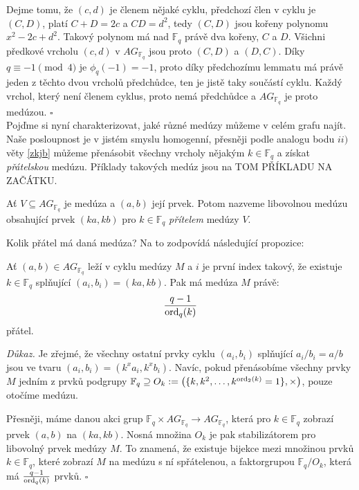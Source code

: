\documentclass[12pt]{report}
\begin{document}
Dejme tomu, že $(c,d)$ je členem nějaké cyklu, předchozí člen v cyklu je $(C,D)$, platí $C+D=2c$ a $CD = d^2$, tedy $(C,D)$ jsou kořeny polynomu $x^2-2c+d^2$. Takový polynom má nad $\mathbb{F}_q$ právě dva kořeny, $C$ a $D$. Všichni předkové vrcholu $(c,d)$ v $AG_{\mathbb{F}_q}$ jsou proto $(C,D)$ a $(D,C)$. Díky $q \equiv -1 \pmod{4}$ je $\phi_q(-1)=-1$, proto díky předchozímu lemmatu má právě jeden z těchto dvou vrcholů předchůdce, ten je jistě taky součástí cyklu. Každý vrchol, který není členem cyklus, proto nemá předchůdce a $AG_{\mathbb{F}_q}$ je proto medúzou. \hfill $\square$\\


Pojďme si nyní charakterizovat, jaké různé medúzy můžeme v celém grafu najít. Naše posloupnost je v jistém smyslu homogenní, přesněji podle analogu bodu $ii)$ věty \ref{zkjb}  můžeme přenásobit všechny vrcholy nějakým $k \in \mathbb{F}_q$ a získat \textit{přátelskou} medúzu. Příklady takových medúz jsou na TOM PŘÍKLADU NA ZAČÁTKU.
\begin{definice}
Ať $V \subseteq AG_{\mathbb{F}_q}$ je medúza a $(a,b)$ její prvek. Potom nazveme libovolnou medúzu obsahující prvek $(ka,kb)$ pro $k \in \mathbb{F}_q$ \textit{přítelem} medúzy $V$.
\end{definice}

 Kolik přátel má daná medúza? Na to zodpovídá následující propozice:
\begin{veta}\label{isom}
Ať $(a,b) \in AG_{\mathbb{F}_q}$ leží v cyklu medúzy $M$ a $i$ je první index takový, že existuje $k \in \mathbb{F}_q$ splňující $(a_i,b_i) = (ka, kb)$. Pak má medúza $M$ právě:
$$\frac{q-1}{\operatorname{ord}_q (k)}$$
přátel.
\end{veta}

\noindent \textit{Důkaz.} Je zřejmé, že všechny ostatní prvky cyklu $(a_i,b_i)$ splňující $a_i/b_i = a/b$ jsou ve tvaru $(a_i,b_i) = (k^x a_i, k^x b_i)$. Navíc, pokud přenásobíme všechny prvky $M$ jedním z prvků podgrupy $\mathbb{F}_q \supseteq O_k := \left( \lbrace k, k^2, \dots, k^{\operatorname{ord}_2 (k)} = 1 \rbrace, \times \right)$, pouze otočíme medúzu.

Přesněji, máme danou akci grup $\mathbb{F}_q \times AG_{\mathbb{F}_q} \longrightarrow AG_{\mathbb{F}_q}$, která pro $k \in \mathbb{F}_q$ zobrazí prvek $(a,b)$ na $(ka,kb)$. Nosná množina $O_k$ je pak stabilizátorem pro libovolný prvek medúzy $M$. To znamená, že existuje bijekce mezi množinou prvků $k \in \mathbb{F}_q$, které zobrazí $M$ na medúzu s ní spřátelenou, a faktorgrupou $\mathbb{F}_q/O_k$, která má $\frac{q-1}{\operatorname{ord}_q (k)}$ prvků. \hfill $\square$\\
\end{document}
